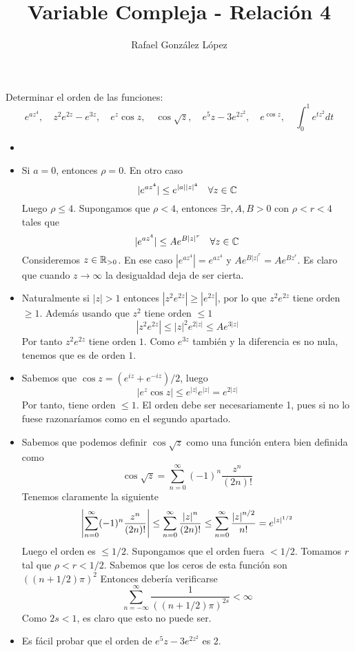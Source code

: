 \documentclass[twoside]{article}
\begin{document}
\title{Variable Compleja - Relación 4}
\author{Rafael González López}
\maketitle


\begin{ejercicio}{1}
Determinar el orden de las funciones:
$$
e^{az^4},\quad z^2e^{2z}-e^{3z},\quad e^z \cos z,\quad \cos\sqrt{z}, \quad e^5z-3e^{2z^2}, \quad e^{\cos z},\quad \int_0^1 e^{tz^2}dt
$$
\end{ejercicio}
\begin{solucion}
\begin{itemize}
\item[]
\item Si $a=0$, entonces $\rho=0$. En otro caso
$$
|e^{az^4}|\leq e^{|a||z|^4} \quad \forall z \in \mathbb{C}
$$
Luego $\rho\leq 4$. Supongamos que $\rho <4$, entonces $\exists r,A,B>0$ con $\rho<r<4$ tales que
$$
|e^{az^4}|\leq Ae^{B|z|^r} \quad \forall z \in \mathbb{C}
$$
Consideremos $z\in \mathbb{R}_{>0}$. En ese caso $|e^{az^4}|=e^{az^4}$ y $ Ae^{B|z|^r} = Ae^{Bz^r}$. Es claro que cuando $z\to \infty$ la desigualdad deja de ser cierta.
\item Naturalmente si $|z|>1$ entonces $|z^2e^{2z}|\geq |e^{2z}|$, por lo que $z^2e^{2z}$ tiene orden $\geq 1$. Además usando que $z^2$ tiene orden $\leq 1$
$$
|z^2e^{2z}|\leq |z|^2e^{2|z|}\leq Ae^{3|z|}
$$
Por tanto $z^2e^{2z}$ tiene orden $1$. Como $e^{3z}$ también y la diferencia es no nula, tenemos que es de orden $1$.
\item Sabemos que $\cos z = (e^{iz}+e^{-iz})/2$, luego
$$
|e^z \cos z| \leq e^{|z|}e^{|z|} = e^{2|z|}
$$
Por tanto, tiene orden $\leq 1$. El orden debe ser necesariamente 1, pues si no lo fuese razonaríamos como en el segundo apartado.
\item Sabemos que podemos definir $\cos \sqrt{z}$ como una función entera bien definida como
$$
\cos \sqrt{z} = \sum_{n=0}^\infty (-1)^n \frac{z^n}{(2n)!}
$$
Tenemos claramente la siguiente 
$$
\left\lvert \sum_{n=0}^\infty (-1)^n \frac{z^n}{(2n)!}\right\rvert \leq \sum_{n=0}^\infty \frac{\left\lvert z\right\rvert^n}{(2n)!} \leq  \sum_{n=0}^\infty \frac{\left\lvert z\right\rvert^{n/2}}{n!} = e^{|z|^{1/2}}
$$
Luego el orden es $\leq 1/2$. Supongamos que el orden fuera $<1/2$. Tomamos $r$ tal que $\rho < r <1/2$. Sabemos que los ceros de esta función son $((n+1/2)\pi)^2$ Entonces debería verificarse
$$
\sum_{n=-\infty}^\infty \frac{1}{((n+1/2)\pi)^{2s}} < \infty
$$
Como $2s < 1$, es claro que esto no puede ser.
\item Es fácil probar que el orden de $e^5z-3e^{2z^2}$ es $2$.

\end{itemize}
\end{solucion}
\end{document}
